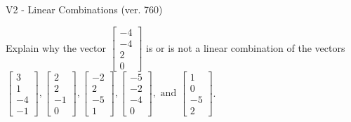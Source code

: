 \begin{exercise}
  \begin{exerciseTitle}V2 - Linear Combinations (ver. 760)\end{exerciseTitle}
  \begin{exerciseStatement}
    Explain why the vector \(\left[\begin{array}{c}
-4 \\
-4 \\
2 \\
0
\end{array}\right]\)  is or is not a linear 
	combination of the vectors \(\left[\begin{array}{c}
3 \\
1 \\
-4 \\
-1
\end{array}\right] , \left[\begin{array}{c}
2 \\
2 \\
-1 \\
0
\end{array}\right] , \left[\begin{array}{c}
-2 \\
2 \\
-5 \\
1
\end{array}\right] , \left[\begin{array}{c}
-5 \\
-2 \\
-4 \\
0
\end{array}\right] , \text{ and } \left[\begin{array}{c}
1 \\
0 \\
-5 \\
2
\end{array}\right]\).
	



\end{exerciseStatement}
\end{exercise}
